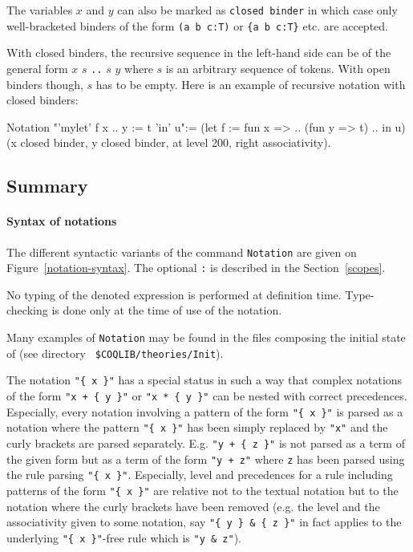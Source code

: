 The variables $x$ and $y$ can also be marked as {\tt closed binder} in
which case only well-bracketed binders of the form {\tt (a b c:T)} or
{\tt \{a b c:T\}} etc. are accepted.

With closed binders, the recursive sequence in the left-hand side can
be of the general form $x$ $s$ {\tt ..} $s$ $y$ where $s$ is an
arbitrary sequence of tokens. With open binders though, $s$ has to be
empty. Here is an example of recursive notation with closed binders:

\begin{coq_example*}
Notation "'mylet' f x .. y :=  t 'in' u":=
  (let f := fun x => .. (fun y => t) .. in u)
  (x closed binder, y closed binder, at level 200, right associativity).
\end{coq_example*}

\subsection{Summary}

\paragraph{Syntax of notations}

The different syntactic variants of the command \texttt{Notation} are
given on Figure~\ref{notation-syntax}. The optional {\tt :{\scope}} is
described in the Section~\ref{scopes}.

\Rem No typing of the denoted expression is performed at definition
time. Type-checking is done only at the time of use of the notation.

\Rem Many examples of {\tt Notation} may be found in the files
composing the initial state of {\Coq} (see directory {\tt
\$COQLIB/theories/Init}).

\Rem The notation \verb="{ x }"= has a special status in such a way
that complex notations of the form \verb="x + { y }"= or
\verb="x * { y }"= can be nested with correct precedences. Especially,
every notation involving a pattern of the form \verb="{ x }"= is
parsed as a notation where the pattern \verb="{ x }"= has been simply
replaced by \verb="x"= and the curly brackets are parsed separately.
E.g. \verb="y + { z }"= is not parsed as a term of the given form but
as a term of the form \verb="y + z"= where \verb=z= has been parsed
using the rule parsing \verb="{ x }"=. Especially, level and
precedences for a rule including patterns of the form \verb="{ x }"=
are relative not to the textual notation but to the notation where the
curly brackets have been removed (e.g. the level and the associativity
given to some notation, say \verb="{ y } & { z }"= in fact applies to
the underlying \verb="{ x }"=-free rule which is \verb="y & z"=).

